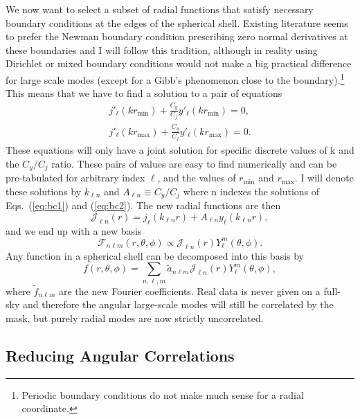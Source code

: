 \documentclass[fleqn,usenatbib]{mnras}
\newcommand{\rmin}{r_\mathrm{min}}
\newcommand{\rmax}{r_\mathrm{max}}
\begin{document}
We now want to select a subset of radial functions that satisfy necessary
boundary conditions at the edges of the spherical shell. Existing literature
seems to prefer the Newman boundary condition prescribing zero normal derivatives at
these boundaries and I will follow this tradition, although in reality using
Dirichlet or mixed boundary conditions would not make a big practical
difference for large scale modes (except for a Gibb's phenomenon close to the
boundary).\footnote{Periodic boundary conditions do not make much sense for a
radial coordinate.} This means that we have to find a solution to a pair of
equations
\begin{align}
\label{eq:bc1}
j'_\ell(k\rmin) + \frac{C_y}{C_j}y'_\ell(k\rmin) = 0,\\
\label{eq:bc2}
j'_\ell(k\rmax) + \frac{C_y}{C_j}y'_\ell(k\rmax) = 0. 
\end{align} 
\noindent 
These equations will only have a joint solution for specific discrete values of
k and the $C_y/C_j$ ratio. These pairs of values are easy to find numerically
and can be pre-tabulated for arbitrary index $\ell$, and the values of $\rmin$
and $\rmax$. I will denote these solutions by $k_{\ell n}$ and $A_{\ell n}
\equiv C_y/C_j$ where n indexes the solutions of Eqs.~(\ref{eq:bc1}) and
(\ref{eq:bc2}). The new radial functions are then
\begin{equation} 
\label{eq:newbasis}
\mathcal{J}_{\ell n}(r) = j_\ell(k_{\ell n}r) + A_{\ell n}y_\ell(k_{\ell n}r),
\end{equation}
\noindent
and we end up with a new basis
\begin{equation}
\mathcal{F}_{n \ell m}(r,\theta,\phi) \propto \mathcal{J}_{\ell n}(r)Y^m_\ell(\theta,\phi).
\end{equation}
Any function in a spherical shell can be decomposed into this basis by
\begin{equation}
f(r,\theta,\phi) = \displaystyle\sum_{n,\ell,m}\widetilde{a}_{n \ell m}\mathcal{J}_
{\ell n}(r)Y^m_\ell(\theta,\phi),
\end{equation}
\noindent
where $\widetilde{f}_{n \ell m}$ are the new Fourier coefficients. Real data is
never given on a full-sky and therefore the angular large-scale modes will
still be correlated by the mask, but purely radial modes are now strictly
uncorrelated.

\subsection{Reducing Angular Correlations}
\end{document}
